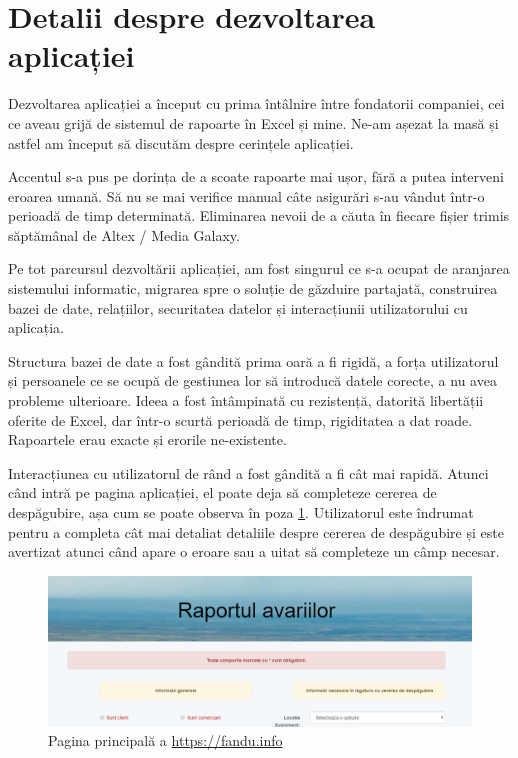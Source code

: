 \section{Detalii despre dezvoltarea aplicației}
	Dezvoltarea aplicației a început cu prima întâlnire între fondatorii companiei, cei ce aveau grijă de sistemul de rapoarte în Excel și mine. Ne-am așezat la masă și astfel am început să discutăm despre cerințele aplicației. 

	Accentul s-a pus pe dorința de a scoate rapoarte mai ușor, fără a putea interveni eroarea umană. Să nu se mai verifice manual câte asigurări s-au vândut într-o perioadă de timp determinată. Eliminarea nevoii de a căuta în fiecare fișier trimis săptămânal de Altex / Media Galaxy.

	Pe tot parcursul dezvoltării aplicației, am fost singurul ce s-a ocupat de aranjarea sistemului informatic, migrarea spre o soluție de găzduire partajată, construirea bazei de date, relațiilor, securitatea datelor și interacțiunii utilizatorului cu aplicația.

	Structura bazei de date a fost gândită prima oară a fi rigidă, a forța utilizatorul și persoanele ce se ocupă de gestiunea lor să introducă datele corecte, a nu avea probleme ulterioare. Ideea a fost întâmpinată cu rezistență, datorită libertății oferite de Excel, dar într-o scurtă perioadă de timp, rigiditatea a dat roade. Rapoartele erau exacte și erorile ne-existente.

	Interacțiunea cu utilizatorul de rând a fost gândită a fi cât mai rapidă. Atunci când intră pe pagina aplicației, el poate deja să completeze cererea de
	despăgubire, așa cum se poate observa în poza \ref{fig:pagina_principala}. Utilizatorul este îndrumat pentru a completa cât mai detaliat detaliile
	despre cererea de despăgubire și este avertizat atunci când apare o eroare sau a uitat să completeze un câmp necesar.
	\begin{figure}
	\includegraphics[width=\linewidth]{../imagini/main.png}
	\caption{Pagina principală a \url{https://fandu.info}}
	\label{fig:pagina_principala}
	\end{figure}

